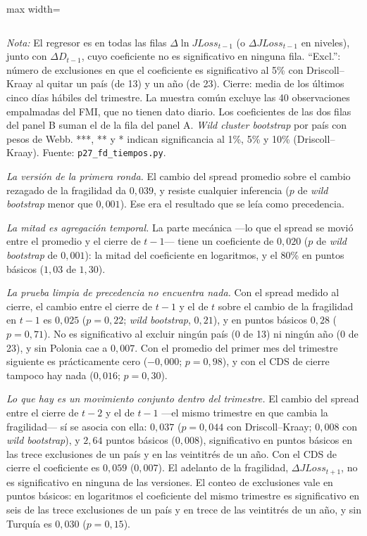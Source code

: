 \begin{table}[htbp]
\begin{adjustbox}{max width=\linewidth}
\begin{tabular}{l cccc cccc}
\bottomrule
\end{tabular}
\end{adjustbox}
\par\smallskip\parbox{0.95\linewidth}{\footnotesize \textit{Nota:} El regresor es en todas las filas $\Delta\ln JLoss_{t-1}$ (o $\Delta JLoss_{t-1}$ en niveles), junto con $\Delta D_{t-1}$, cuyo coeficiente no es significativo en ninguna fila. ``Excl.'': número de exclusiones en que el coeficiente es significativo al 5\% con Driscoll--Kraay al quitar un país (de 13) y un año (de 23). Cierre: media de los últimos cinco días hábiles del trimestre. La muestra común excluye las 40 observaciones empalmadas del FMI, que no tienen dato diario. Los coeficientes de las dos filas del panel B suman el de la fila del panel A. \textit{Wild cluster bootstrap} por país con pesos de Webb. ***, ** y * indican significancia al 1\%, 5\% y 10\% (Driscoll--Kraay). Fuente: \texttt{p27\_fd\_tiempos.py}.}
\end{table}

\emph{La versión de la primera ronda.} El cambio del spread promedio sobre el cambio rezagado de la fragilidad da $0{,}039$, y resiste cualquier inferencia ($p$ de \textit{wild bootstrap} menor que $0{,}001$). Ese era el resultado que se leía como precedencia.

\emph{La mitad es agregación temporal.} La parte mecánica ---lo que el spread se movió entre el promedio y el cierre de $t-1$--- tiene un coeficiente de $0{,}020$ ($p$ de \textit{wild bootstrap} de $0{,}001$): la mitad del coeficiente en logaritmos, y el 80\% en puntos básicos ($1{,}03$ de $1{,}30$).

\emph{La prueba limpia de precedencia no encuentra nada.} Con el spread medido al cierre, el cambio entre el cierre de $t-1$ y el de $t$ sobre el cambio de la fragilidad en $t-1$ es $0{,}025$ ($p=0{,}22$; \textit{wild bootstrap}, $0{,}21$), y en puntos básicos $0{,}28$ ($p=0{,}71$). No es significativo al excluir ningún país (0 de 13) ni ningún año (0 de 23), y sin Polonia cae a $0{,}007$. Con el promedio del primer mes del trimestre siguiente es prácticamente cero ($-0{,}000$; $p=0{,}98$), y con el CDS de cierre tampoco hay nada ($0{,}016$; $p=0{,}30$).

\emph{Lo que hay es un movimiento conjunto dentro del trimestre.} El cambio del spread entre el cierre de $t-2$ y el de $t-1$ ---el mismo trimestre en que cambia la fragilidad--- sí se asocia con ella: $0{,}037$ ($p=0{,}044$ con Driscoll--Kraay; $0{,}008$ con \textit{wild bootstrap}), y $2{,}64$ puntos básicos ($0{,}008$), significativo en puntos básicos en las trece exclusiones de un país y en las veintitrés de un año. Con el CDS de cierre el coeficiente es $0{,}059$ ($0{,}007$). El adelanto de la fragilidad, $\Delta JLoss_{t+1}$, no es significativo en ninguna de las versiones. El conteo de exclusiones vale en puntos básicos: en logaritmos el coeficiente del mismo trimestre es significativo en seis de las trece exclusiones de un país y en trece de las veintitrés de un año, y sin Turquía es $0{,}030$ ($p=0{,}15$).

